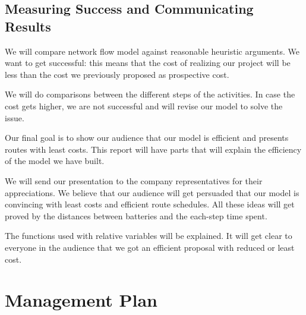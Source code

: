 \documentclass{article}
\begin{document}
\subsection{Measuring Success and Communicating Results}
We will compare network flow model against reasonable heuristic arguments. We want to get successful: this means that the cost of realizing our project will be less than the cost we previously proposed as prospective cost.

We will do comparisons between the different steps of the activities. In case the cost gets higher, we are not successful and will revise our model to solve the issue.

Our final goal is to show our audience that our model is efficient and presents routes with least costs. This report will have parts that will explain the efficiency of the model we have built.

We will send our presentation to the company representatives for their appreciations. We believe that our audience will get persuaded that our model is convincing with least costs and efficient route schedules. All these ideas will get proved by the distances between batteries and the each-step time spent.

The functions used with relative variables will be explained. It will get clear to everyone in the audience that we got an efficient proposal with reduced or least cost.

\section{Management Plan}
\end{document}
